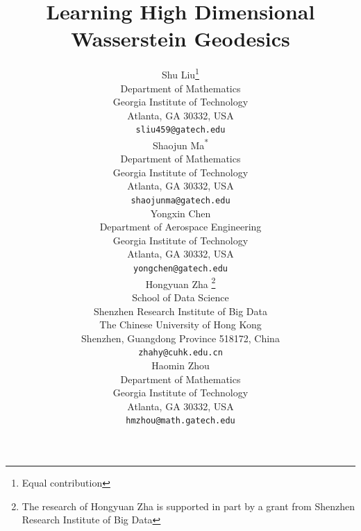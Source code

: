 \documentclass{article}
\title{Learning High Dimensional Wasserstein Geodesics}
\newcommand{\equal}{\textsuperscript{*}}
\begin{document}
\author{
  Shu Liu\thanks{Equal contribution} \\
  Department of Mathematics\\
  Georgia Institute of Technology\\
  Atlanta, GA 30332, USA \\
  \texttt{sliu459@gatech.edu} \\
   \And
   Shaojun Ma\equal\\
   Department of Mathematics \\
   Georgia Institute of Technology\\
    Atlanta, GA 30332, USA\\
   \texttt{shaojunma@gatech.edu} \\
   \And
   Yongxin Chen \\
   Department of Aerospace Engineering \\
   Georgia Institute of Technology\\
   Atlanta, GA 30332, USA \\
   \texttt{yongchen@gatech.edu} \\
   \And
   Hongyuan Zha \thanks{The research of Hongyuan Zha is supported in part by a grant from Shenzhen Research Institute of Big Data}\\
   School of Data Science \\
   Shenzhen Research Institute of Big Data\\
   The Chinese University of Hong Kong\\
   Shenzhen, Guangdong Province 518172, China \\
   \texttt{zhahy@cuhk.edu.cn} \\
   \And
   Haomin Zhou \\
   Department of Mathematics \\
   Georgia Institute of Technology\\
   Atlanta, GA 30332, USA \\
   \texttt{hmzhou@math.gatech.edu} \\
}

\maketitle


\end{document}
